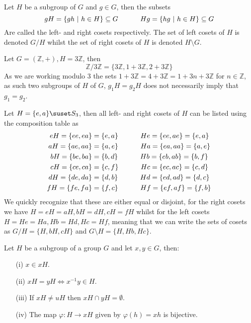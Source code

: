 Let $H$ be a subgroup of $G$ and $g\in G$, then the subsets
\[
    gH=\{gh~|~h\in H\}\subseteq G\hskip 32pt Hg=\{hg~|~h\in H\}\subseteq G
\]
Are called the left- and right cosets respectively. The set of left cosets of $H$ is denoted $G/H$ whilst the set of right cosets of $H$ is denoted $H\setminus G$.
\begin{exmp}
    Let $G=(\mathbb{Z},+),H=3\mathbb{Z}$, then
    \[
        \mathbb{Z}/3\mathbb{Z}=\{3\mathbb{Z},1+3\mathbb{Z},2+3\mathbb{Z}\}
    \]
    As we are working modulo 3 the sets $1+3\mathbb{Z}=4+3\mathbb{Z}=1+3n+3\mathbb{Z}$ for $n\in\mathbb{Z}$, as such two subgroups of $H$ of $G$, $g_{1}H=g_{2}H$ does not necessarily imply that $g_{1}=g_{2}$.
\end{exmp}
\begin{exmp}
    Let $H=\{e,a\}\suset S_{3}$, then all left- and right cosets of $H$ can be listed using the composition table as
    \begin{align*}
        eH=\{ee,ea\}&=\{e,a\}\hskip 32pt He=\{ee,ae\}=\{e,a\} \\
        aH=\{ae,aa\}&=\{a,e\}\hskip 32pt Ha=\{ea,aa\}=\{a,e\} \\
        bH=\{be,ba\}&=\{b,d\}\hskip 32pt Hb=\{eb,ab\}=\{b,f\} \\
        cH=\{ce,ca\}&=\{c,f\}\hskip 32pt Hc=\{ec,ac\}=\{c,d\} \\
        dH=\{de,da\}&=\{d,b\}\hskip 32pt Hd=\{ed,ad\}=\{d,c\} \\
        fH=\{fe,fa\}&=\{f,c\}\hskip 32pt Hf=\{ef,af\}=\{f,b\}
    \end{align*}
    We quickly recognize that these are either equal or disjoint, for the right cosets we have $H=eH=aH,bH=dH,cH=fH$ whilst for the left cosets $H=He=Ha,Hb=Hd,Hc=Hf$, meaning that we can write the sets of cosets as $G/H=\{H,bH,cH\}$ and $G\setminus H=\{H,Hb,Hc\}$.
\end{exmp}
\pagebreak\begin{lemm}
  Let $H$ be a subgroup of a group $G$ and let $x,y\in G$, then:
  \begin{itemize}
      \item[(i)] $x\in xH$.
      \item[(ii)] $xH=yH\iff x^{-1}y\in H$.
      \item[(iii)] If $xH\neq uH$ then $xH\cap yH=\emptyset$.
      \item[(iv)] The map $\varphi:H\rightarrow xH$ given by $\varphi(h)=xh$ is bijective.
  \end{itemize}
\end{lemm}
